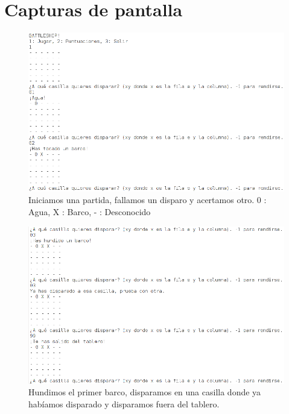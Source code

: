 \documentclass{article}
\begin{document}
\section{Capturas de pantalla}

\begin{figure}[H]
  \centering
  \includegraphics[width = 161mm]{imagenes/Inicio_juego}
  \caption{Iniciamos una partida, fallamos un disparo y acertamos otro. 0 : Agua, X : Barco, - : Desconocido}
\end{figure}

\begin{figure}[H]
  \centering
  \includegraphics[width = 161mm]{imagenes/sigo_jugando}
  \caption{Hundimos el primer barco, disparamos en una casilla donde ya habíamos disparado y disparamos fuera del tablero.}
\end{figure}
\end{document}
